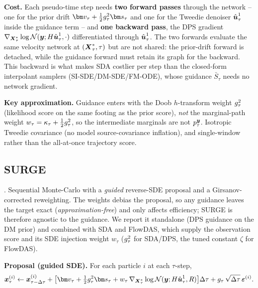 \textbf{Cost.}
Each pseudo-time step needs \textbf{two forward passes} through the network -- one for the prior drift $\fmvel_\tau+\tfrac12\gdiff_\tau^2\genscore_\tau$ and one for the Tweedie denoiser $\hat{\boldsymbol{u}}^1_\tau$ inside the guidance term -- and \textbf{one backward pass}, the DPS gradient $\nabla_{\boldsymbol{X}^{*}_\tau}\log\mathcal{N}(\boldsymbol{y};H\hat{\boldsymbol{u}}^1_\tau,\cdot)$ differentiated through $\hat{\boldsymbol{u}}^1_\tau$. The two forwards evaluate the same velocity network at $(\boldsymbol{X}^{*}_\tau,\tau)$ but are not shared: the prior-drift forward is detached, while the guidance forward must retain its graph for the backward. This backward is what makes SDA costlier per step than the closed-form interpolant samplers (SI-SDE/DM-SDE/FM-ODE), whose guidance $\bar S_\tau$ needs no network gradient.

\textbf{Key approximation.}
Guidance enters with the Doob $h$-transform weight $g_\tau^2$ (likelihood score on the same footing as the prior score), \emph{not} the marginal-path weight $w_\tau=\kappa_\tau+\tfrac12g_\tau^2$, so the intermediate marginals are not $p_\tau^{\boldsymbol{y}}$. Isotropic Tweedie covariance (no model source-covariance inflation), and single-window rather than the all-at-once trajectory score.

\subsection{SURGE}\label{appendix:method:surge}

\cite{wei_surge_2026}. Sequential Monte-Carlo with a \emph{guided} reverse-SDE proposal and a Girsanov-corrected reweighting. The weights debias the proposal, so any guidance leaves the target exact (\emph{approximation-free}) and only affects efficiency; SURGE is therefore agnostic to the guidance. We report it standalone (DPS guidance on the DM prior) and combined with SDA and FlowDAS, which supply the observation score and its SDE injection weight $w_\tau$ ($g_\tau^2$ for SDA/DPS, the tuned constant $\zeta$ for FlowDAS).

\textbf{Proposal (guided SDE).}
For each particle $i$ at each $\tau$-step,
\begin{align}
  \bx_\tau^{(i)} \leftarrow \bx_{\tau-\Delta\tau}^{(i)}
  + \bigl[\fmvel_\tau+\tfrac12\gdiff_\tau^2\genscore_\tau
     + w_\tau\,\nabla_{\bXstar_\tau}\log\mathcal{N}(\obs;\obsmatrix\hat{\state}^1_\tau,\obscov)\bigr]\Delta\tau
  + \gdiff_\tau\,\sqrt{\Delta\tau}\,\boldsymbol\varepsilon^{(i)}.
\end{align}

